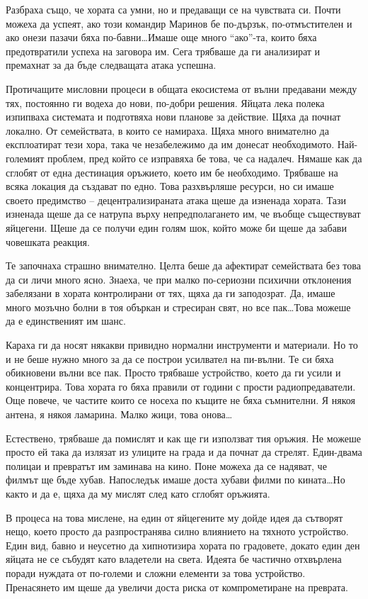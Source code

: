 \documentclass[ebook,openany,12pt]{memoir}
\begin{document}
Разбраха също, че хората са умни, но и предаващи се на чувствата си. Почти можеха да успеят, ако този командир Маринов бе по-дързък, по-отмъстителен и ако онези пазачи бяха по-бавни\ldots Имаше още много ``ако''-та, които бяха предотвратили успеха на заговора им. Сега трябваше да ги анализират и премахнат за да бъде следващата атака успешна.

Протичащите мисловни процеси в общата екосистема от вълни предавани между тях, постоянно ги водеха до нови, по-добри решения. Яйцата лека полека изпипваха системата и подготвяха нови планове за действие. Щяха да почнат локално. От семействата, в които се намираха. Щяха много внимателно да експлоатират тези хора, така че незабележимо да им донесат необходимото. Най-големият проблем, пред който се изправяха бе това, че са надалеч. Нямаше как да сглобят от една дестинация оръжието, което им бе необходимо. Трябваше на всяка локация да създават по едно. Това разхвърляше ресурси, но си имаше своето предимство – децентрализираната атака щеше да изненада хората. Тази изненада щеше да се натрупа върху непредполагането им, че въобще съществуват яйцегени. Щеше да се получи един голям шок, който може би щеше да забави човешката реакция.

Те започнаха страшно внимателно. Целта беше да афектират семействата без това да си личи много ясно. Знаеха, че при малко по-сериозни психични отклонения забелязани в хората контролирани от тях, щяха да ги заподозрат. Да, имаше много мозъчно болни в тоя объркан и стресиран свят, но все пак\ldots Това можеше да е единственият им шанс.

Караха ги да носят някакви привидно нормални инструменти и материали. Но то и не беше нужно много за да се построи усилвател на пи-вълни. Те си бяха обикновени вълни все пак. Просто трябваше устройство, което да ги усили и концентрира. Това хората го бяха правили от години с прости радиопредаватели. Още повече, че частите които се носеха по къщите не бяха съмнителни. Я някоя антена, я някоя ламарина. Малко жици, това онова\ldots

Естествено, трябваше да помислят и как ще ги използват тия оръжия. Не можеше просто ей така да излязат из улиците на града и да почнат да стрелят. Един-двама полицаи и превратът им заминава на кино. Поне можеха да се надяват, че филмът ще бъде хубав. Напоследък имаше доста хубави филми по кината\ldots Но както и да е, щяха да му мислят след като сглобят оръжията.

В процеса на това мислене, на един от яйцегените му дойде идея да сътворят нещо, което просто да разпространява силно влиянието на тяхното устройство. Един вид, бавно и неусетно да хипнотизира хората по градовете, докато един ден яйцата не се събудят като владетели на света. Идеята бе частично отхвърлена поради нуждата от по-големи и сложни елементи за това устройство. Пренасянето им щеше да увеличи доста риска от компрометиране на преврата.
\end{document}

